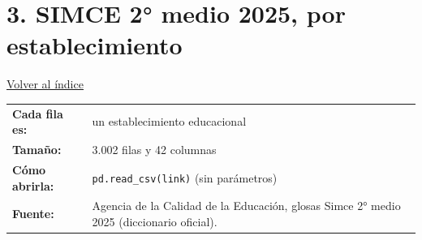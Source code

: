 \documentclass[10.5pt]{article}
\begin{document}
\section*{3. SIMCE 2° medio 2025, por establecimiento}
\vspace{-6pt}\hfill{\small\hyperlink{indice}{\textcolor{azuloscuro}{\underline{Volver al índice}}}}\par\vspace{2pt}
\begin{tabularx}{\linewidth}{@{}l X@{}}\textbf{Cada fila es:} & un establecimiento educacional \\\textbf{Tamaño:} & 3.002 filas y 42 columnas \\\textbf{Cómo abrirla:} & \texttt{pd.read\_\allowbreak{}csv(link)} (sin parámetros) \\\textbf{Fuente:} & Agencia de la Calidad de la Educación, glosas Simce 2° medio 2025 (diccionario oficial). \\\end{tabularx}
\vspace{6pt}
\end{document}
